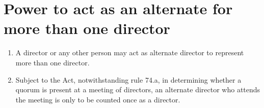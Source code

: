 \section{Power to act as an alternate for more than one director}

\begin{enumerate}[label=(\alph*)]
    \item A director or any other person may act as alternate director to represent more than one director.
    
    \item Subject to the Act, notwithstanding rule 74.a, in determining whether a quorum is present at a meeting of directors, an alternate director who attends the meeting is only to be counted once as a director.
\end{enumerate} 